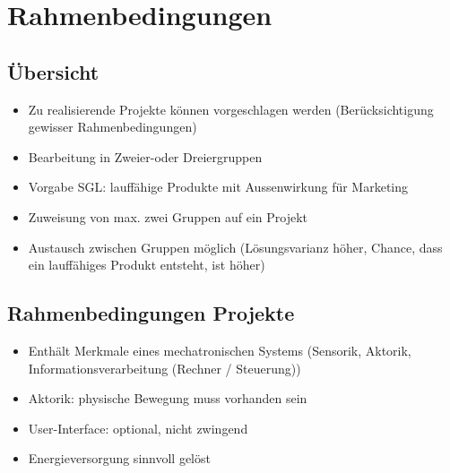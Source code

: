 \section*{Rahmenbedingungen}

\subsection*{Übersicht}
\begin{itemize}
    \item Zu realisierende Projekte können vorgeschlagen werden (Berücksichtigung gewisser Rahmenbedingungen)
    \item Bearbeitung in Zweier-oder Dreiergruppen
    \item Vorgabe SGL: lauffähige Produkte mit Aussenwirkung für Marketing
    \item Zuweisung von max. zwei Gruppen auf ein Projekt
    \item Austausch zwischen Gruppen möglich (Lösungsvarianz höher, Chance, dass ein lauffähiges Produkt entsteht, ist höher)
\end{itemize}
 

\subsection*{Rahmenbedingungen Projekte}
\begin{itemize}
    \item Enthält Merkmale eines mechatronischen Systems (Sensorik, Aktorik, Informationsverarbeitung (Rechner / Steuerung))
    \item Aktorik: physische Bewegung muss vorhanden sein
    \item User-Interface: optional, nicht zwingend
    \item Energieversorgung sinnvoll gelöst    
\end{itemize}

